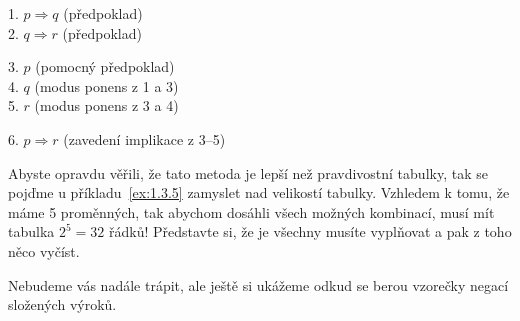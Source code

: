 
\begin{solution}
  \begin{proofbox}
    1. $p \Rightarrow q$ (předpoklad) \\
    2. $q \Rightarrow r$ (předpoklad) 
  \begin{proofbox}
    3. $p$ (pomocný předpoklad) \\
    4. $q$ (modus ponens z 1 a 3) \\
    5. $r$ (modus ponens z 3 a 4)
  \end{proofbox}
    6. $p \Rightarrow r$ (zavedení implikace z 3--5)
  \end{proofbox}
\end{solution}

\begin{definitionbox}
  Abyste opravdu věřili, že tato metoda je lepší než pravdivostní tabulky, tak se pojďme u příkladu~\ref{ex:1.3.5} zamyslet nad velikostí tabulky. Vzhledem k tomu, že máme 5 proměnných, tak abychom dosáhli všech možných kombinací, musí mít tabulka $2^5 = 32$ řádků! Představte si, že je všechny musíte vyplňovat a pak z toho něco vyčíst. 
\end{definitionbox}

Nebudeme vás nadále trápit, ale ještě si ukážeme odkud se berou vzorečky negací složených výroků.

